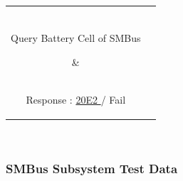 \documentclass[12pt]{article}
\begin{document}
\begin{table}[h!]
\begin{tabular}{ | c | c | }
\hline
\parbox{0.5\linewidth}{\raggedright \hfill \\[-0.25 em]
Query Battery Cell of SMBus
\hfill \\[0.1 em]} &  \parbox{0.4\linewidth}{\raggedright \hfill \\ [0.7 em]
Response :  \underline{\hspace{0.02in}
20E2
\hspace{0.02in}}  \space / \space  Fail \hfill \\ [0.3 em]} \\ 
\hline
\end{tabular}
\end{table}
\hfill \\

\subsubsection{SMBus Subsystem Test  Data}
\hfill
\end{document}
